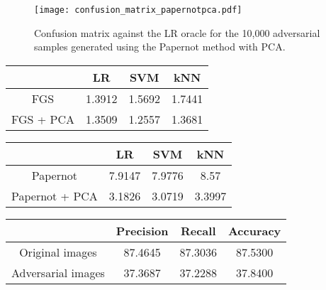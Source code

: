 \begin{figure}
    \centering
    \texttt{[image: confusion\_matrix\_papernotpca.pdf]}
    \caption{Confusion matrix against the LR oracle for the 10,000 adversarial samples generated using the Papernot method with PCA.}
    \label{fig:confusion_matrix_papernotpca}
\end{figure}

\begin{table}
\centering
\begin{tabular}{c|ccc}
\toprule
&LR & SVM & kNN \\
\midrule
FGS & 1.3912 & 1.5692 & 1.7441 \\
FGS + PCA & 1.3509 & 1.2557 & 1.3681\\
\bottomrule
\end{tabular}
    \label{runtime_FGS}
\end{table}

\begin{table} 
\centering
\begin{tabular}{c|ccc}
\toprule
&LR & SVM & kNN \\
\midrule
Papernot & 7.9147 & 7.9776 & 8.57\\
Papernot + PCA & 3.1826 & 3.0719 & 3.3997\\
\bottomrule
\end{tabular}
   \label{runtime_Papernot}
\end{table}

\begin{table}
\centering
\begin{tabular}{c|ccc}
\toprule
&Precision & Recall & Accuracy \\
\midrule
Original images & 87.4645 &  87.3036  & 87.5300 \\
Adversarial images & 37.3687 &  37.2288 &  37.8400\\
\bottomrule
\end{tabular}
   \label{tablewithstuff}
\end{table}

